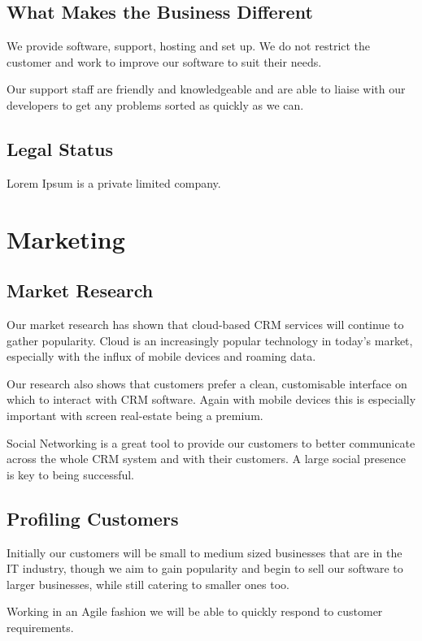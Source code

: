 \documentclass[DIV=calc, paper=a4, fontsize=11pt]{scrartcl}	 %
\begin{document}
\subsection{What Makes the Business Different}
We provide software, support, hosting and set up. We do not restrict the customer and work to 
improve our software to suit their needs.

Our support staff are friendly and knowledgeable and are able to liaise with our developers to get
any problems sorted as quickly as we can.


\subsection{Legal Status}
Lorem Ipsum is a private limited company.

\section{Marketing}

\subsection{Market Research}
Our market research has shown that cloud-based CRM services will continue to gather popularity.
Cloud is an increasingly popular technology in today's market, especially with the influx of
mobile devices and roaming data.

Our research also shows that customers prefer a clean, customisable interface on which to interact
with CRM software. Again with mobile devices this is especially important with screen real-estate
being a premium.

Social Networking is a great tool to provide our customers to better communicate across the whole
CRM system and with their customers. A large social presence is key to being successful.

\subsection{Profiling Customers}
Initially our customers will be small to medium sized businesses that are in the IT industry, 
though we aim to gain popularity and begin to sell our software to larger businesses, while still
catering to smaller ones too.

Working in an Agile fashion we will be able to quickly respond to customer requirements.
\end{document}
